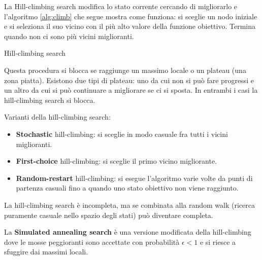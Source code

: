 La Hill-climbing search modifica lo stato corrente cercando di migliorarlo e
l'algoritmo \ref{alg:climb} che segue mostra come funziona: si sceglie un nodo
iniziale e si seleziona il suo vicino con il più alto valore della funzione
obiettivo. Termina quando non ci sono più vicini miglioranti.

\begin{algorithm}
    \caption{Hill-climbing search}
    \label{alg:climb}
    \begin{algorithmic}[1]
         
            \Loop
              \EndIf
            \EndLoop
        \EndProcedure
    \end{algorithmic}
\end{algorithm}

Questa procedura si blocca se raggiunge un massimo locale o un plateau (una zona
piatta).
Esistono due tipi di plateau: uno da cui non si può fare progressi e un
altro da cui si può continuare a migliorare se ci si sposta. In entrambi i casi
la hill-climbing search si blocca.

Varianti della hill-climbing search:

\begin{itemize}
 \item \textbf{Stochastic} hill-climbing: si sceglie in modo casuale fra
tutti i vicini miglioranti.
 \item \textbf{First-choice} hill-climbing: si sceglie il primo vicino
migliorante.
 \item \textbf{Random-restart} hill-climbing: si esegue l'algoritmo varie volte
da punti di partenza casuali fino a quando uno stato obiettivo non viene
raggiunto.
\end{itemize}

La hill-climbing search è incompleta, ma se combinata alla random walk
(ricerca puramente casuale nello spazio degli stati) può diventare completa.

La \textbf{Simulated annealing search} è una versione modificata
della hill-climbing dove le mosse peggioranti sono accettate con probabilità
$\epsilon < 1$ e si riesce a sfuggire dai massimi locali.

